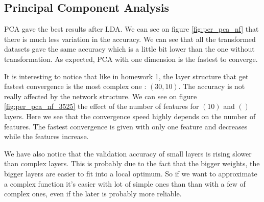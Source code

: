 \documentclass[twocolumn, 10pt]{article}
\begin{document}
		\subsection{Principal Component Analysis}
			PCA gave the best results after LDA. We can see on figure \ref{fig:per_pca_nf} that there is much less variation in the accuracy. We can see that all the transformed datasets gave the same accuracy which is a little bit lower than the one without transformation. As expected, PCA with one dimension is the fastest to converge.

			It is interesting to notice that like in homework 1, the layer structure that get fastest convergence is the most complex one : $(30, 10)$. The accuracy is not really affected by the network structure. We can see on figure \ref{fig:per_pca_nf_3525} the effect of the number of features for $(10)$ and $()$ layers. Here we see that the convergence speed highly depends on the number of features. The fastest convergence is given with only one feature and decreases while the features increase.

			We have also notice that the validation accuracy of small layers is rising slower than complex layers. This is probably due to the fact that the bigger weights, the bigger layers are easier to fit into a local optimum. So if we want to approximate a complex function it's easier with lot of simple ones than than with a few of complex ones, even if the later is probably more reliable.
\end{document}
